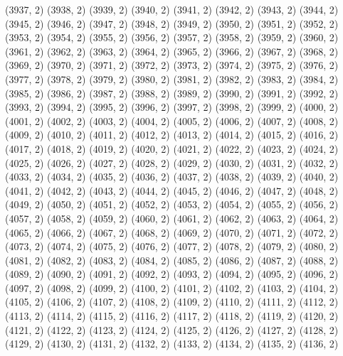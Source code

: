 {   (3937, 2)
   (3938, 2)
   (3939, 2)
   (3940, 2)
   (3941, 2)
   (3942, 2)
   (3943, 2)
   (3944, 2)
   (3945, 2)
   (3946, 2)
   (3947, 2)
   (3948, 2)
   (3949, 2)
   (3950, 2)
   (3951, 2)
   (3952, 2)
   (3953, 2)
   (3954, 2)
   (3955, 2)
   (3956, 2)
   (3957, 2)
   (3958, 2)
   (3959, 2)
   (3960, 2)
   (3961, 2)
   (3962, 2)
   (3963, 2)
   (3964, 2)
   (3965, 2)
   (3966, 2)
   (3967, 2)
   (3968, 2)
   (3969, 2)
   (3970, 2)
   (3971, 2)
   (3972, 2)
   (3973, 2)
   (3974, 2)
   (3975, 2)
   (3976, 2)
   (3977, 2)
   (3978, 2)
   (3979, 2)
   (3980, 2)
   (3981, 2)
   (3982, 2)
   (3983, 2)
   (3984, 2)
   (3985, 2)
   (3986, 2)
   (3987, 2)
   (3988, 2)
   (3989, 2)
   (3990, 2)
   (3991, 2)
   (3992, 2)
   (3993, 2)
   (3994, 2)
   (3995, 2)
   (3996, 2)
   (3997, 2)
   (3998, 2)
   (3999, 2)
   (4000, 2)
   (4001, 2)
   (4002, 2)
   (4003, 2)
   (4004, 2)
   (4005, 2)
   (4006, 2)
   (4007, 2)
   (4008, 2)
   (4009, 2)
   (4010, 2)
   (4011, 2)
   (4012, 2)
   (4013, 2)
   (4014, 2)
   (4015, 2)
   (4016, 2)
   (4017, 2)
   (4018, 2)
   (4019, 2)
   (4020, 2)
   (4021, 2)
   (4022, 2)
   (4023, 2)
   (4024, 2)
   (4025, 2)
   (4026, 2)
   (4027, 2)
   (4028, 2)
   (4029, 2)
   (4030, 2)
   (4031, 2)
   (4032, 2)
   (4033, 2)
   (4034, 2)
   (4035, 2)
   (4036, 2)
   (4037, 2)
   (4038, 2)
   (4039, 2)
   (4040, 2)
   (4041, 2)
   (4042, 2)
   (4043, 2)
   (4044, 2)
   (4045, 2)
   (4046, 2)
   (4047, 2)
   (4048, 2)
   (4049, 2)
   (4050, 2)
   (4051, 2)
   (4052, 2)
   (4053, 2)
   (4054, 2)
   (4055, 2)
   (4056, 2)
   (4057, 2)
   (4058, 2)
   (4059, 2)
   (4060, 2)
   (4061, 2)
   (4062, 2)
   (4063, 2)
   (4064, 2)
   (4065, 2)
   (4066, 2)
   (4067, 2)
   (4068, 2)
   (4069, 2)
   (4070, 2)
   (4071, 2)
   (4072, 2)
   (4073, 2)
   (4074, 2)
   (4075, 2)
   (4076, 2)
   (4077, 2)
   (4078, 2)
   (4079, 2)
   (4080, 2)
   (4081, 2)
   (4082, 2)
   (4083, 2)
   (4084, 2)
   (4085, 2)
   (4086, 2)
   (4087, 2)
   (4088, 2)
   (4089, 2)
   (4090, 2)
   (4091, 2)
   (4092, 2)
   (4093, 2)
   (4094, 2)
   (4095, 2)
   (4096, 2)
   (4097, 2)
   (4098, 2)
   (4099, 2)
   (4100, 2)
   (4101, 2)
   (4102, 2)
   (4103, 2)
   (4104, 2)
   (4105, 2)
   (4106, 2)
   (4107, 2)
   (4108, 2)
   (4109, 2)
   (4110, 2)
   (4111, 2)
   (4112, 2)
   (4113, 2)
   (4114, 2)
   (4115, 2)
   (4116, 2)
   (4117, 2)
   (4118, 2)
   (4119, 2)
   (4120, 2)
   (4121, 2)
   (4122, 2)
   (4123, 2)
   (4124, 2)
   (4125, 2)
   (4126, 2)
   (4127, 2)
   (4128, 2)
   (4129, 2)
   (4130, 2)
   (4131, 2)
   (4132, 2)
   (4133, 2)
   (4134, 2)
   (4135, 2)
   (4136, 2)
}
